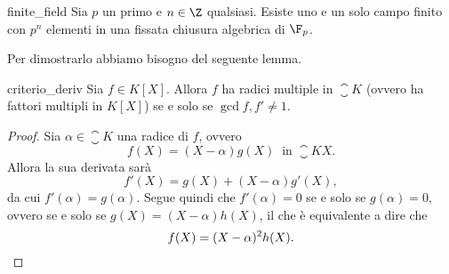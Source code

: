 \begin{theorem}
    {finite_field}
    Sia $p$ un primo e $n \in \Z$ qualsiasi. Esiste uno e un solo campo finito con $p^n$ elementi in una fissata chiusura algebrica di $\F_p$.
\end{theorem}

Per dimostrarlo abbiamo bisogno del seguente lemma.
\begin{lemma}
    {criterio_deriv}
    Sia $f \in K[X]$. Allora $f$ ha radici multiple in $\closure K$ (ovvero ha fattori multipli in $K[X]$) se e solo se $\gcd{f, f'} \neq 1$.
\end{lemma}
\begin{proof}
    Sia $\alpha \in \closure K$ una radice di $f$, ovvero \[
        f(X) = (X - \alpha)g(X) \;\;\text{in } \closure{K}{X}.    
    \] Allora la sua derivata sarà \[
        f'(X) = g(X) + (X-\alpha)g'(X),    
    \] da cui $f'(\alpha) = g(\alpha)$. Segue quindi che $f'(\alpha) = 0$ se e solo se $g(\alpha) = 0$, ovvero se e solo se $g(X) = (X-\alpha)h(X)$, il che è equivalente a dire che \[
        f(X) = (X-\alpha)^2 h(X). \qedhere    
    \]
\end{proof}

